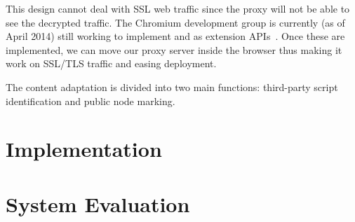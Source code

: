 This design cannot deal with SSL web traffic since the proxy will not be able to see the decrypted traffic.  The Chromium development group is currently (as of April 2014) still working to implement  and  as extension APIs~\cite{webRequest}.  Once these are implemented, we can move our proxy server inside the browser thus making it work on SSL/TLS traffic and easing deployment.  
  
The content adaptation is divided into two main functions: third-party script identification and public node marking.

\section{Implementation}
\label{sec:esorics_impl}

\section{System Evaluation}
\label{sec:esorics_evaluation}